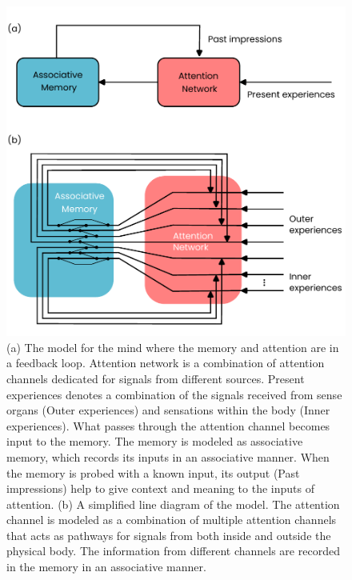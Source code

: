\documentclass[reprint,amsmath,amssymb,apr,aip,onecolumn, 11pt]{revtex4-1}
\begin{document}
	
	
	\begin{figure}[h!]
		\centerline{\includegraphics[width=0.8\linewidth]{figures/figure_man_model.pdf}}
		\caption{(a) The model for the mind where the memory and attention are in a feedback loop. Attention network is a combination of attention channels dedicated for signals from different sources. Present experiences denotes a combination of  the signals received from sense organs (Outer experiences) and sensations within the body (Inner experiences). What passes through the attention channel becomes input to the memory. The memory is modeled as associative memory, which records its inputs in an associative manner. When the memory is probed with a known input, its output  (Past impressions) help to give context and meaning to the inputs of attention. (b) A simplified line diagram of the model. The attention channel is modeled as a combination of multiple attention channels that acts as pathways for signals from both inside and outside the physical body. The information from different channels are recorded in the memory in an associative manner. }
		\label{fig:model}
	\end{figure}
	
\end{document}

